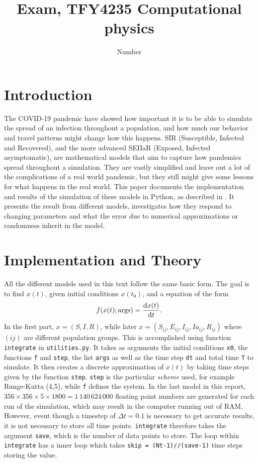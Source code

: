 \documentclass{article}
\title{Exam, TFY4235 Computational physics}
\author{Number}
\date{}
\begin{document}
    \maketitle
    \section*{Introduction}
    The COVID-19 pandemic have showed how important it is to be able to simulate the spread of an infection throughout a population, and how much our behavior and travel patterns might change how this happens.
    SIR (Susceptible, Infected and Recovered), and the more advanced SEIIaR (Exposed, Infected asymptomatic), are mathematical models that aim to capture how pandemics spread throughout a simulation.
    They are vastly simplified and leave out a lot of the complications of a real world pandemic, but they still might give some lessons for what happens in the real world.
    This paper documents the implementation and results of the simulation of these models in Python, as described in \cite{exam}.
    It presents the result from different models, investigates how they respond to changing parameters and what the error due to numerical approximations or randomness inherit in the model.

    \section*{Implementation and Theory}
    All the different models used in this text follow the same basic form. 
    The goal is to find $x(t)$, given initial conditions $x(t_0)$, and a equation of the form
    \begin{equation*}
        f(x(t); \mathrm{args}) = \dv{x(t)}{t}.
    \end{equation*}
    In the first part, $x = (S, I, R)$, while later $x = (S_{ij}, E_{ij}, I_{ij}, Ia_{ij}, R_{ij})$ where $(ij)$ are different population groups. 
    This is accomplished using function \verb|integrate| in \verb|utilities.py|. 
    It takes as arguments the initial conditions \verb|x0|, the functions \verb|f| and \verb|step|, the list \verb|args| as well as the time step \verb|dt| and total time \verb|T| to simulate. 
    It then creates a discrete approximation of $x(t)$ by taking time steps given by the function \verb|step|. 
    \verb|step| is the particular \emph{scheme} used, for example Runge-Kutta (4,5), while \verb|f| defines the system. In the last model in this report, $356\times356\times5\times1800=1\,140\,624\,000$ floating point numbers are generated for each run of the simulation, which may result in the computer running out of RAM.
    However, event though a timestep of $\Delta t = 0.1$ is necessary to get accurate results, it is not necessary to store all time points.
    \verb|integrate| therefore takes the argument \verb|save|, which is the number of data points to store.
    The loop within \verb|integrate| has a inner loop which takes \verb|skip = (Nt-1)//(save-1)| time steps storing the value.
    
\end{document}
